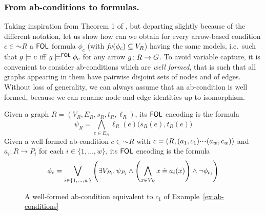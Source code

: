 \subsubsection{From ab-conditions to formulas.}

Taking inspiration from Theorem 1 of \cite{Rensink-FOL}, but departing slightly because of the different notation, let us show how can we obtain for every arrow-based condition $c\in \AC{R}$ a $\mathsf{FOL}$ formula $\phi_c$ (with $\mathit{fv}(\phi_c)\subseteq V_R$) having the same models, i.e.\ such that $g\models c$ iff $g\models^{\mathsf{FOL}} \phi_c$ for any arrow $g\colon R\rightarrow G$. To avoid variable capture, it is convenient to consider ab-conditions which are \emph{well formed}, that is such that all graphs appearing in them have pairwise disjoint sets of nodes and of edges. Without loss of generality, we can always assume that an ab-condition is well formed, because we can rename node and edge identities up to isomorphism.

\begin{definition}
  \label{def:encoding}
  Given a graph $R = (V_R, E_R, s_R, t_R, \ell_R)$, its $\mathsf{FOL}$ encoding is the formula   
\begin{equation}
	\psi_R = %
 \bigwedge_{e\in E_R} \ell_R(e)\bigl(s_R(e),t_R(e)\bigr)\label{eq:psiR}
\end{equation}
Given a well-formed ab-condition $c\in \AC R$ with $c=(R,(a_1,c_1){\cdotp\mkern-2mu\cdotp\mkern-2mu\cdotp\mkern1mu} (a_w,c_w))$ and $a_i:R \to P_i$ for each $i \in \{1, \ldots, w\}$, its $\mathsf{FOL}$ encoding is the formula 
\begin{align}
	\phi_c = %
  \bigvee_{i\in \{1,\ldots,w\}} \left(\exists V_{P_i}\st \psi_{P_i} \land  \left(\bigwedge_{x \in V_{R}} x \Eq a_i(x)\right) \land  \neg \phi_{c_i}\right)\label{eq:phiC}
\end{align}
\end{definition}

\begin{figure}[t]
  \centering
{}
\caption{A well-formed ab-condition equivalent to $c_1$ of Example~\ref{ex:ab-conditions}}
\label{ab-condition-c}
\end{figure}


